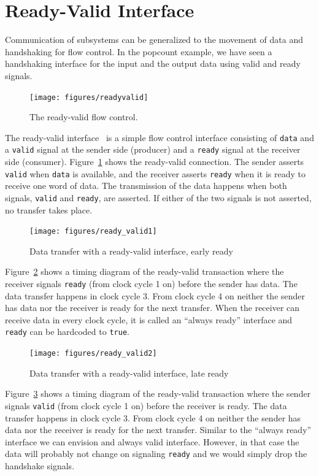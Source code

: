 \documentclass[%
    10pt,
    headinclude, footexclude,
    openright, %
    notitlepage,
    cleardoubleempty,
    headsepline,
    pointlessnumbers,
    bibtotoc, idxtotoc,
    ]{scrbook}
\newcommand{\code}[1]{{\small{\texttt{#1}}}}
\begin{document}
\section{Ready-Valid Interface}

Communication of subsystems can be generalized to the movement
of data and handshaking for flow control. In the popcount example,
we have seen a handshaking interface for the input and the output data
using valid and ready signals.

\begin{figure}
  \centering
  \texttt{[image: figures/readyvalid]}
  \caption{The ready-valid flow control.}
  \label{fig:readyvalid}
\end{figure}

The ready-valid interface~\cite[p.~480]{dally:vhdl:2016} is a simple flow
control interface consisting of \code{data} and a \code{valid} signal at the
sender side (producer) and a \code{ready} signal at the receiver side (consumer).
Figure~\ref{fig:readyvalid} shows the ready-valid connection.
The sender asserts \code{valid} when \code{data} is available,
and the receiver asserts \code{ready} when it is ready to receive one word
of data. The transmission of the data happens when both signals, \code{valid}
and \code{ready}, are asserted. If either of the two signals is not asserted,
no transfer takes place.

\begin{figure}
  \centering
  \texttt{[image: figures/ready\_valid1]}
  \caption{Data transfer with a ready-valid interface, early ready}
  \label{fig:ready_valid1}
\end{figure}

Figure~\ref{fig:ready_valid1} shows a timing diagram of the ready-valid
transaction where the receiver signals \code{ready} (from clock cycle 1 on)
before the sender has data. The data transfer happens in clock cycle 3.
From clock cycle 4 on neither the sender has data nor the receiver is ready
for the next transfer.
When the receiver can receive data in every clock cycle, it is called an
``always ready'' interface and \code{ready} can be hardcoded to \code{true}.

\begin{figure}
  \centering
  \texttt{[image: figures/ready\_valid2]}
  \caption{Data transfer with a ready-valid interface, late ready}
  \label{fig:ready_valid2}
\end{figure}

Figure~\ref{fig:ready_valid2} shows a timing diagram of the ready-valid
transaction where the sender signals \code{valid} (from clock cycle 1 on)
before the receiver is ready. The data transfer happens in clock cycle 3.
From clock cycle 4 on neither the sender has data nor the receiver is ready
for the next transfer.
Similar to the ``always ready'' interface we can envision and always valid
interface. However, in that case the data will probably not change on signaling
\code{ready} and we would simply drop the handshake signals.
\end{document}
